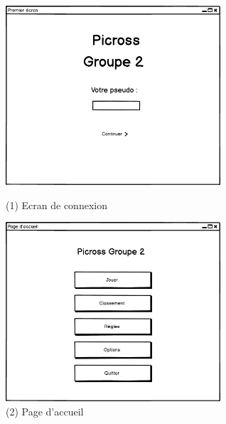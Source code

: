 \documentclass{report}
\begin{document}
		
	\begin{figure}[H]
    		\begin{minipage}[c]{.46\linewidth}
       			\centering
       			\includegraphics[width=8cm]{Maquettes/Premier_ecran.png}
        			\caption{(1) Ecran de connexion}
    		\end{minipage}
    		\hfill
   		\begin{minipage}[c]{.46\linewidth}
        			\centering
       			 \includegraphics[width=8cm]{Maquettes/Page_Accueil.png}
        			\caption{(2) Page d'accueil}
    		\end{minipage}
	\end{figure}
	
\end{document}
